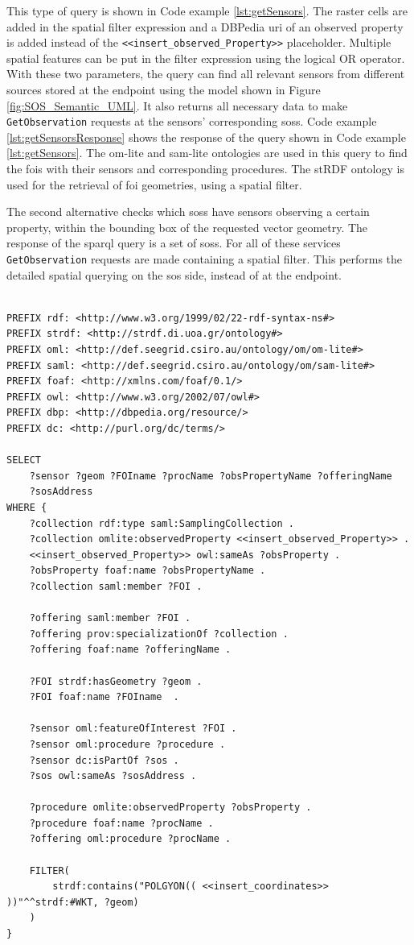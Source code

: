 This type of query is shown in Code example \ref{lst:getSensors}. The raster cells are added in the spatial filter expression and a DBPedia \ac{uri} of an observed property is added instead of the \texttt{<<insert\_observed\_Property>>} placeholder. Multiple spatial features can be put in the filter expression using the logical OR operator. With these two parameters, the query can find all relevant sensors from different sources stored at the endpoint using the model shown in Figure \ref{fig:SOS_Semantic_UML}. It also returns all necessary data to make \texttt{GetObservation} requests at the sensors' corresponding \aclp{sos}. Code example \ref{lst:getSensorsResponse} shows the response of the query shown in  Code example \ref{lst:getSensors}. The om-lite and sam-lite ontologies are used in this query to find the \acp{foi} with their sensors and corresponding procedures. The stRDF ontology is used for the retrieval of \ac{foi} geometries, using a spatial filter.  

The second alternative checks which \aclp{sos} have sensors observing a certain property, within the bounding box of the requested vector geometry. The response of the \ac{sparql} query is a set of \aclp{sos}. For all of these services \texttt{GetObservation} requests are made containing a spatial filter. This performs the detailed spatial querying on the \ac{sos} side, instead of at the endpoint. 

\begin{lstlisting}[float,caption={A spatial SPARQL query for discovering sensors and their SOS related metadata}, label={lst:getSensors}]

PREFIX rdf: <http://www.w3.org/1999/02/22-rdf-syntax-ns#>
PREFIX strdf: <http://strdf.di.uoa.gr/ontology#>
PREFIX oml: <http://def.seegrid.csiro.au/ontology/om/om-lite#>
PREFIX saml: <http://def.seegrid.csiro.au/ontology/om/sam-lite#>
PREFIX foaf: <http://xmlns.com/foaf/0.1/>
PREFIX owl: <http://www.w3.org/2002/07/owl#>
PREFIX dbp: <http://dbpedia.org/resource/>
PREFIX dc: <http://purl.org/dc/terms/>

SELECT 
	?sensor ?geom ?FOIname ?procName ?obsPropertyName ?offeringName 
	?sosAddress
WHERE {
	?collection rdf:type saml:SamplingCollection .
	?collection omlite:observedProperty <<insert_observed_Property>> .
	<<insert_observed_Property>> owl:sameAs ?obsProperty .
	?obsProperty foaf:name ?obsPropertyName .
	?collection saml:member ?FOI .
	
	?offering saml:member ?FOI . 
	?offering prov:specializationOf ?collection .
	?offering foaf:name ?offeringName .
	
	?FOI strdf:hasGeometry ?geom . 
	?FOI foaf:name ?FOIname  .
	
	?sensor oml:featureOfInterest ?FOI .
	?sensor oml:procedure ?procedure .
	?sensor dc:isPartOf ?sos .
	?sos owl:sameAs ?sosAddress .
	
	?procedure omlite:observedProperty ?obsProperty .
	?procedure foaf:name ?procName .
	?offering oml:procedure ?procName .
	
	FILTER(
		strdf:contains("POLGYON(( <<insert_coordinates>> ))"^^strdf:#WKT, ?geom)
	)		
}
\end{lstlisting}

